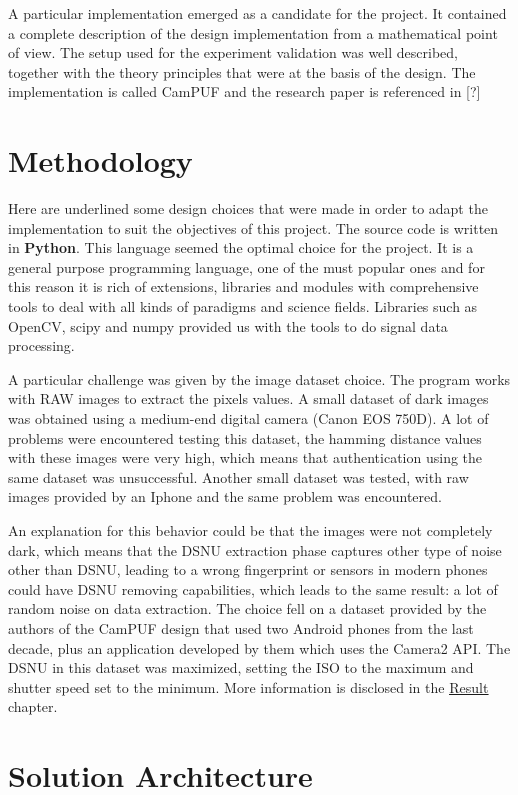 A particular implementation emerged as a candidate for the project. It contained a complete description of the design implementation from a mathematical point of view.
The setup used for the experiment validation was well described, together with the theory principles that were at the basis of the design.
The implementation is called CamPUF and the research paper is referenced in [?]


\section{\textbf{Methodology}}
Here are underlined some design choices that were made in order to adapt the implementation to suit the objectives of this project.
The source code is written in \textbf{Python}. This language seemed the optimal choice for the project. It is a general purpose programming language, one of the must popular ones
and for this reason it is rich of extensions, libraries and modules with comprehensive tools to deal with all kinds of paradigms and science fields.
Libraries such as OpenCV, scipy and numpy provided us with the tools to do signal data processing.

A particular challenge was given by the image dataset choice. The program works with RAW images to extract the pixels values. A small dataset of dark images was obtained using a medium-end digital camera (Canon EOS 750D).
A lot of problems were encountered testing this dataset, the hamming distance values with these images were very high, which means that authentication using the same dataset was unsuccessful.
Another small dataset was tested, with raw images provided by an Iphone and the same problem was encountered. 

An explanation for this behavior could be that the images were not completely dark, which means that the DSNU extraction phase captures other type of noise other than DSNU,
leading to a wrong fingerprint or sensors in modern phones could have DSNU removing capabilities, which leads to the same result: a lot of random noise on data extraction.
The choice fell on a dataset provided by the authors of the CamPUF design that used two Android phones from the last decade, plus an application developed by them which uses the Camera2 API.
The DSNU in this dataset was maximized, setting the ISO to the maximum and shutter speed set to the minimum. More information is disclosed in the \underline{\hyperref[chap:results]{Result}} chapter.

\section{\textbf{Solution Architecture}}
